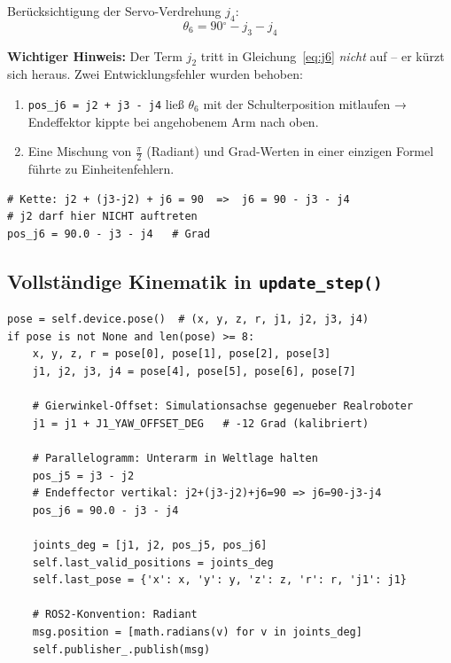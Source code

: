\documentclass[11pt,a4paper]{article}
\begin{document}
Berücksichtigung der Servo-Verdrehung $j_4$:
\begin{equation}
  \boxed{\theta_6 = 90{{}^\circ} - j_3 - j_4}
  \label{eq:j6}
\end{equation}

\begin{warnbox}
\textbf{Wichtiger Hinweis:} Der Term $j_2$ tritt in
Gleichung~\eqref{eq:j6} \emph{nicht} auf -- er kürzt sich heraus.
Zwei Entwicklungsfehler wurden behoben:
\begin{enumerate}
  \item \texttt{pos\_j6 = j2 + j3 - j4} ließ $\theta_6$ mit der
        Schulterposition mitlaufen → Endeffektor kippte bei
        angehobenem Arm nach oben.
  \item Eine Mischung von $\frac{\pi}{2}$ (Radiant) und Grad-Werten
        in einer einzigen Formel führte zu Einheitenfehlern.
\end{enumerate}
\end{warnbox}

\begin{lstlisting}[caption={Korrekte Berechnung joint\_6 in update\_step()}]
# Kette: j2 + (j3-j2) + j6 = 90  =>  j6 = 90 - j3 - j4
# j2 darf hier NICHT auftreten
pos_j6 = 90.0 - j3 - j4   # Grad
\end{lstlisting}

\subsection{Vollständige Kinematik in \texttt{update\_step()}}

\begin{lstlisting}[caption={Kinematik-Kern in update\_step() (Ausschnitt aus extension.py)}]
pose = self.device.pose()  # (x, y, z, r, j1, j2, j3, j4)
if pose is not None and len(pose) >= 8:
    x, y, z, r = pose[0], pose[1], pose[2], pose[3]
    j1, j2, j3, j4 = pose[4], pose[5], pose[6], pose[7]

    # Gierwinkel-Offset: Simulationsachse gegenueber Realroboter
    j1 = j1 + J1_YAW_OFFSET_DEG   # -12 Grad (kalibriert)

    # Parallelogramm: Unterarm in Weltlage halten
    pos_j5 = j3 - j2
    # Endeffector vertikal: j2+(j3-j2)+j6=90 => j6=90-j3-j4
    pos_j6 = 90.0 - j3 - j4

    joints_deg = [j1, j2, pos_j5, pos_j6]
    self.last_valid_positions = joints_deg
    self.last_pose = {'x': x, 'y': y, 'z': z, 'r': r, 'j1': j1}

    # ROS2-Konvention: Radiant
    msg.position = [math.radians(v) for v in joints_deg]
    self.publisher_.publish(msg)
\end{lstlisting}
\end{document}

